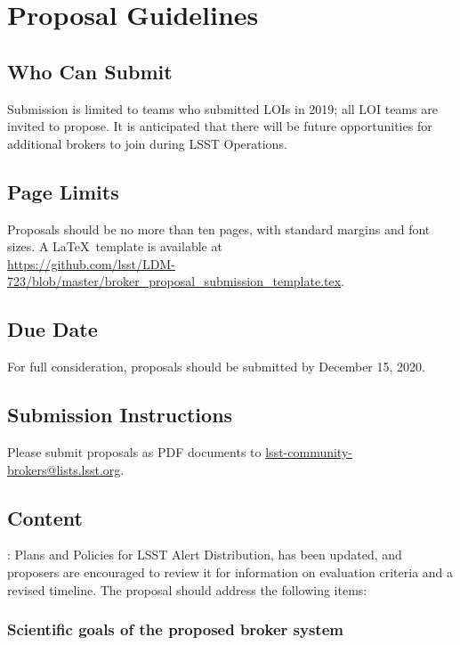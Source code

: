 \documentclass[DM,toc]{lsstdoc}
\begin{document}
\section{Proposal Guidelines}

\subsection{Who Can Submit}

Submission is limited to teams who submitted LOIs in 2019; all LOI teams are invited to propose.
It is anticipated that there will be future opportunities for additional brokers to join during LSST Operations.

\subsection{Page Limits}

Proposals should be no more than ten pages, with standard margins and font sizes.
A \LaTeX\ template is available at \\
\url{https://github.com/lsst/LDM-723/blob/master/broker_proposal_submission_template.tex}.

\subsection{Due Date}

For full consideration, proposals should be submitted by December 15, 2020.

\subsection{Submission Instructions}

Please submit proposals as PDF documents to \url{lsst-community-brokers@lists.lsst.org}.

\subsection{Content}


: Plans and Policies for LSST Alert Distribution, has been updated, and proposers are encouraged to review it for information on evaluation criteria and a revised timeline.
The proposal should address the following items:

\subsubsection{Scientific goals of the proposed broker system}
\end{document}
